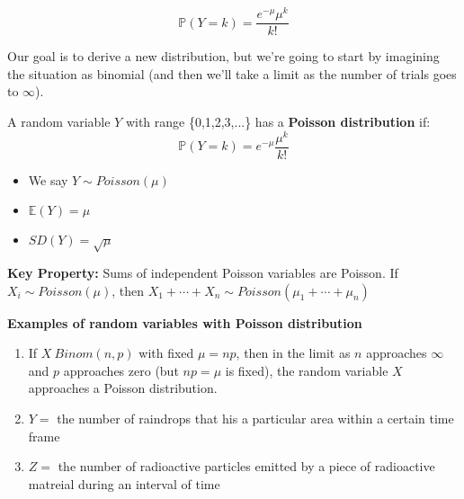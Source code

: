 \documentclass[titlepage, 12pt, leqno]{article}
\begin{document}
\[
    \boxed{\mathbb{P}(Y=k) = \frac{e^{-\mu}\mu^k}{k!}}
\]

Our goal is to derive a new distribution, but we're going to start by imagining
the situation as binomial (and then we'll take a limit as the number of trials
goes to $\infty$).

\begin{definition}
    A random variable $Y$ with range \{0,1,2,3,...\} has a 
    \textbf{Poisson distribution} if:
    \[
        \mathbb{P}(Y=k)=e^{-\mu}\frac{\mu^k}{k!}
    \]
    \begin{itemize}
        \item We say $Y \sim Poisson(\mu)$
        \item $ \mathbb{E}(Y) = \mu$
        \item $SD(Y) = \sqrt{\mu}$
    \end{itemize}
\end{definition}

\begin{note}
    \textbf{Key Property:} Sums of independent Poisson variables are Poisson. If
    $X_i \sim Poisson(\mu)$, then $X_1 + \cdots  + X_n \sim  Poisson(\mu_1 +
    \cdots + \mu_n)$
\end{note}

\textbf{Examples of random variables with Poisson distribution}
\begin{enumerate}
    \item If $X ~ Binom(n,p)$ with fixed $\mu = np$, then in the limit as $n$
        approaches $\infty$ and $p$ approaches zero (but $np = \mu$ is fixed),
        the random variable $X$ approaches a Poisson distribution.
    \item $Y = $ the number of raindrops that his a particular area within a 
        certain time frame
    \item $Z = $ the number of radioactive particles emitted by a piece of 
        radioactive matreial during an interval of time
\end{enumerate}
\end{document}
